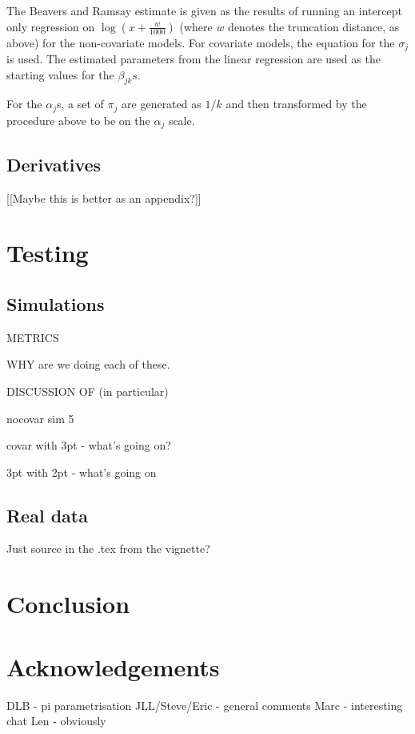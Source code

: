 The Beavers and Ramsay estimate is given as the results of running an intercept only regression on $\log(x+\frac{w}{1000})$ (where $w$ denotes the truncation distance, as above) for the non-covariate models. For covariate models, the equation for the $\sigma_j$ is used. The estimated parameters from the linear regression are used as the starting values for the $\beta_{jk}s$.

For the $\alpha_j$s, a set of $\pi_j$ are generated as $1/k$ and then transformed by the procedure above to be on the $\alpha_j$ scale.



\subsection{Derivatives}
[[Maybe this is better as an appendix?]]


\section{Testing}

\subsection{Simulations}

METRICS

WHY are we doing each of these.

DISCUSSION OF (in particular)

nocovar sim 5

covar with 3pt - what's going on?

3pt with 2pt - what's going on

\subsection{Real data}

Just source in the .tex from the vignette?




\section{Conclusion}


\section{Acknowledgements}
DLB - pi parametrisation
JLL/Steve/Eric - general comments
Marc - interesting chat
Len - obviously



